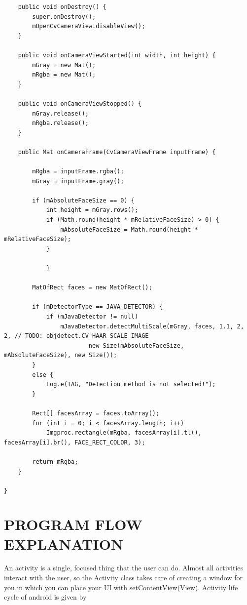 \documentclass[10pt,a4paper,twoside]{report}
\begin{document}
\begin{appendix}
\begin{tiny}
\begin{flushleft}
\begin{lstlisting}
    public void onDestroy() {
        super.onDestroy();
        mOpenCvCameraView.disableView();
    }

    public void onCameraViewStarted(int width, int height) {
        mGray = new Mat();
        mRgba = new Mat();
    }

    public void onCameraViewStopped() {
        mGray.release();
        mRgba.release();
    }

    public Mat onCameraFrame(CvCameraViewFrame inputFrame) {

        mRgba = inputFrame.rgba();
        mGray = inputFrame.gray();

        if (mAbsoluteFaceSize == 0) {
            int height = mGray.rows();
            if (Math.round(height * mRelativeFaceSize) > 0) {
                mAbsoluteFaceSize = Math.round(height * mRelativeFaceSize);
            }

	        }

        MatOfRect faces = new MatOfRect();

        if (mDetectorType == JAVA_DETECTOR) {
            if (mJavaDetector != null)
                mJavaDetector.detectMultiScale(mGray, faces, 1.1, 2, 2, // TODO: objdetect.CV_HAAR_SCALE_IMAGE
                        new Size(mAbsoluteFaceSize, mAbsoluteFaceSize), new Size());
        }
        else {
            Log.e(TAG, "Detection method is not selected!");
        }

        Rect[] facesArray = faces.toArray();
        for (int i = 0; i < facesArray.length; i++)
            Imgproc.rectangle(mRgba, facesArray[i].tl(), facesArray[i].br(), FACE_RECT_COLOR, 3);

        return mRgba;
    }

}

\end{lstlisting}


\end{flushleft}
\end{tiny}
\newpage
\section{PROGRAM FLOW EXPLANATION}
\paragraph{ }
An activity is a single, focused thing that the user can do. Almost all activities interact with the user, so the Activity class takes care of creating a window for you in which you can place your UI with setContentView(View). Activity life cycle of android is given by
\begin{figure}[htpb]


\end{figure}
\end{appendix}
\end{document}
